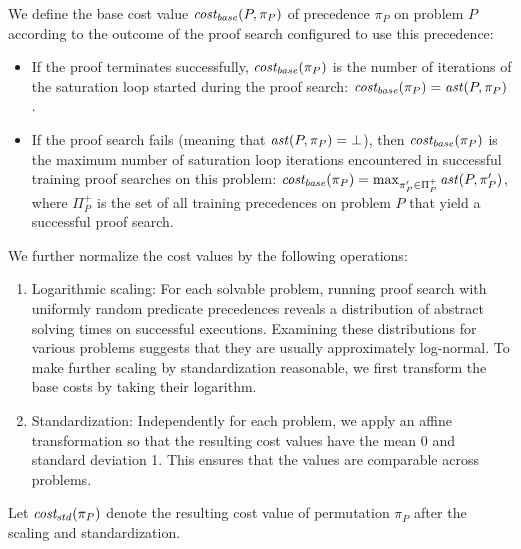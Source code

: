 
We define the base cost
value \(\operatorname{\mathit{cost_{base}}}(P, \pi_P)\) of precedence \(\pi_P\) on problem \(P\)
according to the outcome of the proof search configured to use this precedence:

\begin{itemize}
	\item If the proof terminates successfully,
	\(\operatorname{\mathit{cost_{base}}}(\pi_P)\) is the number of iterations of the saturation loop
	started during the proof search: \(\operatorname{\mathit{cost_{base}}}(\pi_P) = \operatorname{\mathit{ast}}(P, \pi_P)\).
	\item If the proof search fails (meaning that \(\operatorname{\mathit{ast}}(P, \pi_P) = \bot\)),
	then \(\operatorname{\mathit{cost_{base}}}(\pi_P)\) is the maximum number
	of saturation loop iterations encountered in successful training proof searches on this problem:
	\(\operatorname{\mathit{cost_{base}}}(\pi_P) = \max_{\pi_P' \in \Pi^+_P} \operatorname{\mathit{ast}}(P, \pi_P')\),
	where \(\Pi^+_P\) is the set of all training precedences on problem \(P\)
	that yield a successful proof search.
\end{itemize}
We further normalize the cost values by the following operations:
\begin{enumerate}
	\item Logarithmic scaling:
	For each solvable problem, running proof search with uniformly random predicate precedences
	reveals a distribution of abstract solving times on successful executions.
	Examining these distributions for various problems suggests that they are usually
	approximately log-normal.
	To make further scaling by standardization reasonable,
	we first transform the base costs by taking their logarithm.
	\item Standardization: %
	Independently for each problem,
	we apply an affine transformation so that the resulting cost values
	have the mean 0 and standard deviation 1.
	This ensures that the values are comparable across problems.
\end{enumerate}
Let \(\operatorname{\mathit{cost_{std}}}(\pi_P)\) denote the resulting cost value of permutation \(\pi_P\)
after the scaling and standardization.

